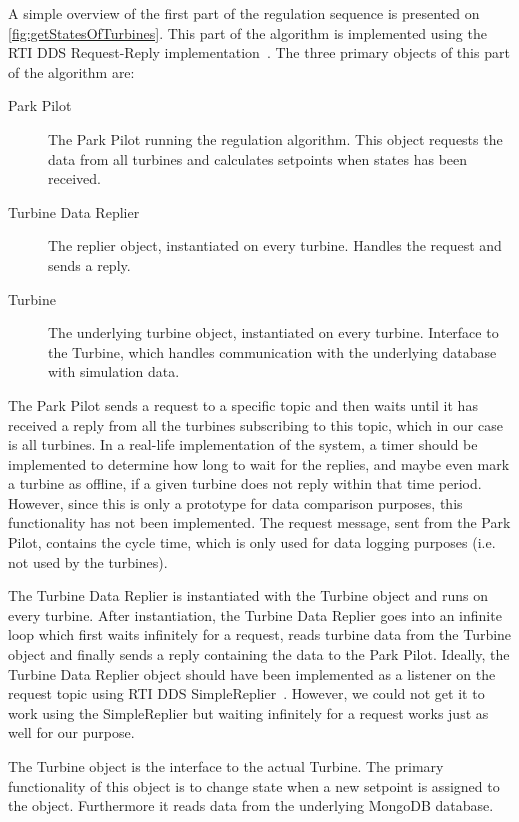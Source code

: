 A simple overview of the first part of the regulation sequence is presented on \cref{fig:getStatesOfTurbines}. This part of the algorithm is implemented using the RTI DDS Request-Reply implementation~\cite{rtiConnextUsersManual}. The three primary objects of this part of the algorithm are:

\begin{description}
	\item [Park Pilot] The Park Pilot running the regulation algorithm. This object requests the data from all turbines and calculates setpoints when states has been received.
	\item [Turbine Data Replier] The replier object, instantiated on every turbine. Handles the request and sends a reply.
	\item [Turbine] The underlying turbine object, instantiated on every turbine. Interface to the Turbine, which handles communication with the underlying database with simulation data.
\end{description}

The Park Pilot sends a request to a specific topic and then waits until it has received a reply from all the turbines subscribing to this topic, which in our case is all turbines. In a real-life implementation of the system, a timer should be implemented to determine how long to wait for the replies, and maybe even mark a turbine as offline, if a given turbine does not reply within that time period. However, since this is only a prototype for data comparison purposes, this functionality has not been implemented. The request message, sent from the Park Pilot, contains the cycle time, which is only used for data logging purposes (i.e. not used by the turbines).

The Turbine Data Replier is instantiated with the Turbine object and runs on every turbine. After instantiation, the Turbine Data Replier goes into an infinite loop which first waits infinitely for a request, reads turbine data from the Turbine object and finally sends a reply containing the data to the Park Pilot. Ideally, the Turbine Data Replier object should have been implemented as a listener on the request topic using RTI DDS SimpleReplier~\cite{rtiConnextUsersManual}. However, we could not get it to work using the SimpleReplier but waiting infinitely for a request works just as well for our purpose.

The Turbine object is the interface to the actual Turbine. The primary functionality of this object is to change state when a new setpoint is assigned to the object. Furthermore it reads data from the underlying MongoDB database. 

